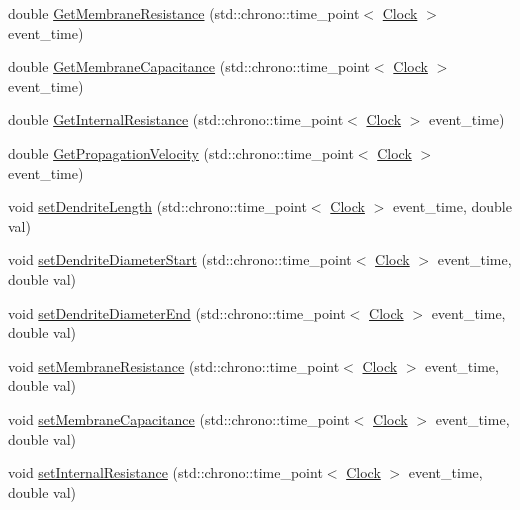 \begin{DoxyCompactItemize}
double \hyperlink{class_dendrite_ab70008318cada82e0f21f8f010858eaa}{Get\+Membrane\+Resistance} (std\+::chrono\+::time\+\_\+point$<$ \hyperlink{universe_8h_a0ef8d951d1ca5ab3cfaf7ab4c7a6fd80}{Clock} $>$ event\+\_\+time)
\item 
double \hyperlink{class_dendrite_a3551fe5fcf9c7ec767a6171f61a5ba51}{Get\+Membrane\+Capacitance} (std\+::chrono\+::time\+\_\+point$<$ \hyperlink{universe_8h_a0ef8d951d1ca5ab3cfaf7ab4c7a6fd80}{Clock} $>$ event\+\_\+time)
\item 
double \hyperlink{class_dendrite_a7dd00ac5440edf9943389951a275b9bc}{Get\+Internal\+Resistance} (std\+::chrono\+::time\+\_\+point$<$ \hyperlink{universe_8h_a0ef8d951d1ca5ab3cfaf7ab4c7a6fd80}{Clock} $>$ event\+\_\+time)
\item 
double \hyperlink{class_dendrite_af0315957a349532d25691385b6486e95}{Get\+Propagation\+Velocity} (std\+::chrono\+::time\+\_\+point$<$ \hyperlink{universe_8h_a0ef8d951d1ca5ab3cfaf7ab4c7a6fd80}{Clock} $>$ event\+\_\+time)
\item 
void \hyperlink{class_dendrite_a9bc84d369ac487b095ed1641f89469d2}{set\+Dendrite\+Length} (std\+::chrono\+::time\+\_\+point$<$ \hyperlink{universe_8h_a0ef8d951d1ca5ab3cfaf7ab4c7a6fd80}{Clock} $>$ event\+\_\+time, double val)
\item 
void \hyperlink{class_dendrite_af33658a5420b56cfd321d75ae5784302}{set\+Dendrite\+Diameter\+Start} (std\+::chrono\+::time\+\_\+point$<$ \hyperlink{universe_8h_a0ef8d951d1ca5ab3cfaf7ab4c7a6fd80}{Clock} $>$ event\+\_\+time, double val)
\item 
void \hyperlink{class_dendrite_ada331daa4464ae007b3f77612aa46937}{set\+Dendrite\+Diameter\+End} (std\+::chrono\+::time\+\_\+point$<$ \hyperlink{universe_8h_a0ef8d951d1ca5ab3cfaf7ab4c7a6fd80}{Clock} $>$ event\+\_\+time, double val)
\item 
void \hyperlink{class_dendrite_af6141643bf2c85404ae9c320611d1d31}{set\+Membrane\+Resistance} (std\+::chrono\+::time\+\_\+point$<$ \hyperlink{universe_8h_a0ef8d951d1ca5ab3cfaf7ab4c7a6fd80}{Clock} $>$ event\+\_\+time, double val)
\item 
void \hyperlink{class_dendrite_a6fed149ffe00cf781a41a9f260f8eeb2}{set\+Membrane\+Capacitance} (std\+::chrono\+::time\+\_\+point$<$ \hyperlink{universe_8h_a0ef8d951d1ca5ab3cfaf7ab4c7a6fd80}{Clock} $>$ event\+\_\+time, double val)
\item 
void \hyperlink{class_dendrite_ac79018e356cec31be05518b85c73a54d}{set\+Internal\+Resistance} (std\+::chrono\+::time\+\_\+point$<$ \hyperlink{universe_8h_a0ef8d951d1ca5ab3cfaf7ab4c7a6fd80}{Clock} $>$ event\+\_\+time, double val)

\end{DoxyCompactItemize}
